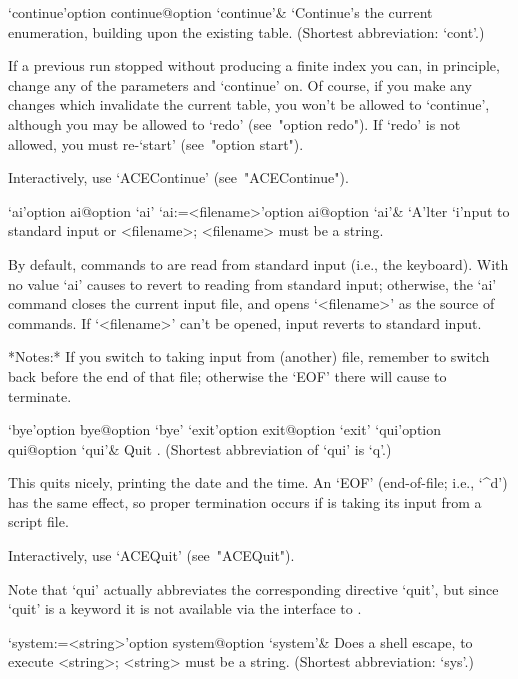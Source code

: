 \>`continue'{option continue}@{option `continue'}&
`Continue's the current enumeration, building upon the existing table.
(Shortest abbreviation: `cont'.)

If a previous run stopped without producing a finite index you can, in
principle, change any of the parameters and `continue' on. Of  course,
if you make any changes which invalidate the current table, you  won't
be allowed to `continue',  although  you  may  be  allowed  to  `redo'
(see~"option redo"). If `redo' is not  allowed,  you  must  re-`start'
(see~"option start").

Interactively, use `ACEContinue' (see~"ACEContinue").

\enditems


\beginitems

\>`ai'{option ai}@{option `ai'}
\>`ai:=<filename>'{option ai}@{option `ai'}&
`A'lter `i'nput to standard input or <filename>; <filename> must be  a
string.

By default, commands to {\ACE} are read from standard input (i.e., the
keyboard). With no value `ai' causes {\ACE} to revert to reading  from
standard input; otherwise, the `ai' command closes the  current  input
file,  and  opens  `<filename>'  as  the  source   of   commands.   If
`<filename>' can't be opened, input reverts to standard input.

*Notes:*
If you switch to taking input from (another) file, remember to  switch
back before the end of that file; otherwise the `EOF' there will cause
{\ACE} to terminate.

\>`bye'{option bye}@{option `bye'}
\>`exit'{option exit}@{option `exit'}
\>`qui'{option qui}@{option `qui'}&
Quit {\ACE}. (Shortest abbreviation of `qui' is `q'.)

This quits {\ACE} nicely, printing the date and  the  time.  An  `EOF'
(end-of-file;  i.e.,  `\^{}d')  has  the  same   effect,   so   proper
termination occurs if {\ACE} is taking its input from a script file.

Interactively, use `ACEQuit' (see~"ACEQuit").

Note  that  `qui'  actually  abbreviates  the   corresponding   {\ACE}
directive `quit', but since `quit' is  a  {\GAP}  keyword  it  is  not
available via the {\GAP} interface to {\ACE}.

\>`system:=<string>'{option system}@{option `system'}&
Does a shell escape, to execute <string>; <string> must be a string.
(Shortest abbreviation: `sys'.)

